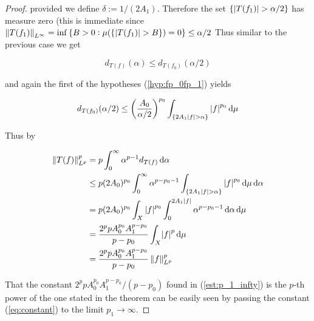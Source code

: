 \begin{proof}
\noindent provided we define $\delta := 1/(2A_1)$. Therefore the set $\cbr[0]{\abs[0]{ T(f_1)} > \alpha/2}$ has measure zero (this is immediate since $\norm[0]{T(f_1)}_{L^\infty} =  \inf \cbr[0]{B > 0: \mu(\cbr[0]{\abs[0]{ T(f_1)} > B}) = 0 } \leq \alpha/2 $ Thus similar to the previous case we get 

\begin{equation*}
	d_{T(f)}(\alpha) \leq d_{T(f_0)}(\alpha/2)
\end{equation*}

	\noindent and again the first of the hypotheses (\ref{hyp:fp_0fp_1}) yields 
	
\begin{equation*}
	d_{T(f_0)}(\alpha/2) \leq \del{\frac{A_0}{\alpha/2}}^{p_0} \int_{\cbr[0]{2A_1\abs[0]{ f } > \alpha}} \abs[0]{ f }^{p_0}\d\mu
\end{equation*}

	Thus by

	\begin{equation}
		\begin{aligned}
			\norm[0]{T(f)}_{L^p}^p &= p \int_0^{\infty} \alpha^{p-1}d_{T(f)} \d\alpha\\
			&\leq p (2A_0)^{p_0} \int_0^{\infty} \alpha^{p-p_0-1} \int_{\cbr[0]{2A_1\abs[0]{ f } > \alpha}} \abs[0]{ f }^{p_0}\d\mu \d\alpha\\
			&= p(2A_0)^{p_0} \int_X \abs[0]{ f}^{p_0} \int_0^{2A_1\abs[0]{f }} \alpha^{p - p_0 - 1}\d\alpha\d\mu\\
			&= \frac{2^ppA_0^{p_0}A_1^{p - p_0}}{p - p_0} \int_X \abs{ f}^{p} \d\mu\\
			&= \frac{2^ppA_0^{p_0}A_1^{p - p_0}}{p - p_0} \norm[0]{f}_{L^p}^p
			\label{est:p_1_infty}
		\end{aligned}
	\end{equation}

	That the constant $2^ppA_0^{p_0}A_1^{p - p_0}/(p - p_0)$ found in (\ref{est:p_1_infty}) is the $p$-th power of the one stated in the theorem can be easily seen by passing the constant (\ref{eq:constant}) to the limit $p_1 \rightarrow \infty$.
\end{proof}
